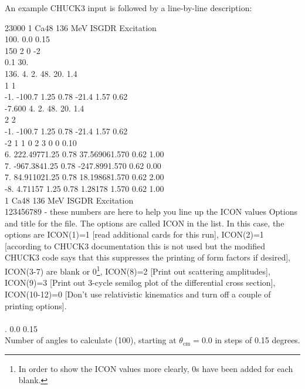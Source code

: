 \documentclass[a4paper,10pt]{article}
\begin{document}
An example CHUCK3 input is followed by a line-by-line description:

     23000     1    Ca48  136 MeV      ISGDR Excitation\\
100.    0.0    0.15\\
150  2  0 -2\\
0.1     30.\\
136.    4.      2.      48.     20.     1.4\\
  1  1\\
-1.     -100.7  1.25    0.78            -21.4   1.57    0.62 \\
-7.600  4.      2.      48.     20.     1.4\\
  2  2\\
-1.     -100.7  1.25    0.78            -21.4   1.57    0.62 \\
 -2  1  1  0  2  3  0  0 0.10\\
6.      222.49771.25    0.78            37.569061.570   0.62            1.00\\
7.      -967.3841.25    0.78            -247.8991.570   0.62            0.00\\
7.      84.911021.25    0.78            18.198681.570   0.62            2.00\\
-8.     4.71157 1.25    0.78            1.28178 1.570   0.62            1.00\\
            
     1    Ca48  136 MeV      ISGDR Excitation\\
123456789 - these numbers are here to help you line up the ICON values
Options and title for the file. The options are called ICON in the list. In this case, the options are ICON(1)=1 [read additional cards for this run], ICON(2)=1 [according to CHUCK3 documentation this is not used but the modified CHUCK3 code says that this suppresses the printing of form factors if desired], ICON(3-7) are blank or 0\footnote{In order to show the ICON values more clearly, 0s have been added for each blank.}, ICON(8)=2 [Print out scattering amplitudes], ICON(9)=3 [Print out 3-cycle semilog plot of the differential cross section], ICON(10-12)=0 [Don't use relativistic kinematics and turn off a couple of printing options]. \\ \\

.    0.0    0.15\\
Number of angles to calculate (100), starting at $\theta_\mathrm{cm} = 0.0$ in steps of 0.15 degrees.\\
\end{document}
